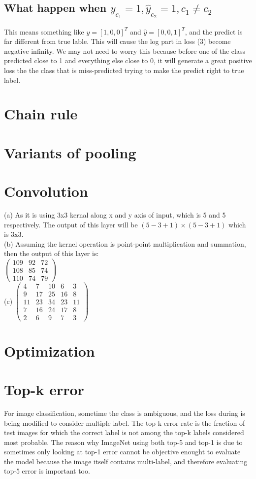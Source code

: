 \documentclass{article}
\begin{document}
\subsection{What happen when $y_{c_1}=1, \hat{y}_{c_2}=1, c_1 \neq c_2$}
This means something like $y = [1, 0, 0]^T$ and $\hat{y} = [0,0,1]^T$, and the predict is far different from true lable. This will cause the log part in loss (3) become negative infinity. We may not need to worry this because before one of the class predicted close to 1 and everything else close to 0, it will generate a great positive loss the the class that is miss-predicted trying to make the predict right to true label.
\section{Chain rule}
\section{Variants of pooling}
\section{Convolution}
(a) As it is using 3x3 kernal along x and y axis of input, which is 5 and 5 respectively. The output of this layer will be $(5-3+1)\times(5-3+1)$ which is 3x3.\\
(b) Assuming the kernel operation is point-point multiplication and summation, then the output of this layer is:\\
$\begin{pmatrix}
  109 & 92 & 72 \\[0.4em]
  108 & 85 & 74 \\[0.4em]
  110 & 74 & 79
\end{pmatrix}$ \\
(c)
$\begin{pmatrix}
  4 & 7 & 10 & 6 & 3 \\[0.4em]
  9 & 17 & 25 & 16 & 8 \\[0.4em]
  11 & 23 & 34 & 23 & 11 \\[0.4em]
  7 & 16 & 24 & 17 & 8 \\[0.4em]
  2 & 6 & 9 &7 & 3
\end{pmatrix}$ \\


\section{Optimization}
\section{Top-k error}
For image classification, sometime the class is ambiguous, and the loss during is being modified to consider multiple label. The top-k error rate is the fraction of test images for which the correct label is not among the top-k labels considered most probable. The reason why ImageNet using both top-5 and top-1 is due to sometimes only looking at top-1 error cannot be objective enought to evaluate the model because the image itself contains multi-label, and therefore evaluating top-5 error is important too.
\end{document}
